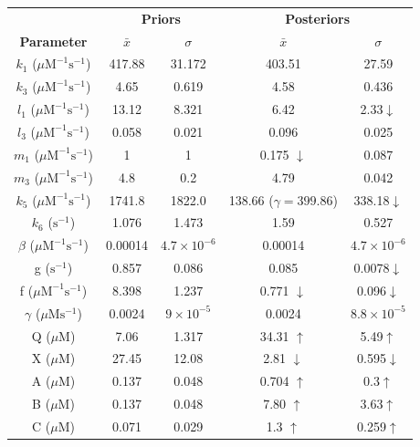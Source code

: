 \begin{table}[tbp]%
\renewcommand{\arraystretch}{1.5}
\begin{center}
\begin{tabular}{ccccc}
\toprule
& \multicolumn{2}{c}{\textbf{Priors}} & \multicolumn{2}{c}{\textbf{Posteriors}} \\
\textbf{Parameter} & ${\bar{x}}$ & $\sigma$ & ${\bar{x}}$ & $\sigma$\\
\midrule
$k_1$ ($\mu \mathrm{M}^{-1} \mathrm{s}^{-1}$) & 417.88 & 31.172 & 403.51 & 27.59\\
$k_3$ ($\mu \mathrm{M}^{-1} \mathrm{s}^{-1}$) & 4.65 &  0.619 & 4.58 & 0.436\\
$l_1$ ($\mu \mathrm{M}^{-1} \mathrm{s}^{-1}$) & 13.12 & 8.321 & 6.42 & 2.33$\downarrow$\\
$l_3$ ($\mu \mathrm{M}^{-1} \mathrm{s}^{-1}$) & 0.058 & 0.021 & 0.096 & 0.025\\
$m_1$ ($\mu \mathrm{M}^{-1} \mathrm{s}^{-1}$) & 1 & 1 & 0.175 $\downarrow$ & 0.087\\
$m_3$ ($\mu \mathrm{M}^{-1} \mathrm{s}^{-1}$) & 4.8 & 0.2 & 4.79 & 0.042\\
$k_5$ ($\mu \mathrm{M}^{-1} \mathrm{s}^{-1}$) & 1741.8 & 1822.0 & 138.66 ($\gamma = 399.86$) & 338.18$\downarrow$\\
$k_6$ ($\mathrm{s}^{-1}$) & 1.076 & 1.473 & 1.59 & 0.527\\
$\beta$ ($\mu \mathrm{M}^{-1} \mathrm{s}^{-1}$) & 0.00014 & $4.7\times 10^{-6}$ & 0.00014 & $4.7\times 10^{-6}$\\
g ($\mathrm{s}^{-1}$) & 0.857 & 0.086 & 0.085 & 0.0078$\downarrow$\\
f ($\mu \mathrm{M}^{-1} \mathrm{s}^{-1}$) & 8.398 & 1.237 & 0.771 $\downarrow$ & 0.096$\downarrow$\\
$\gamma$ ($\mu \mathrm{M} \mathrm{s}^{-1}$) & 0.0024 & $9\times 10^{-5}$ & 0.0024 & $8.8\times 10^{-5}$\\
Q ($\mu \mathrm{M}$) & 7.06 & 1.317 & 34.31 $\uparrow$ & 5.49$\uparrow$\\
X ($\mu \mathrm{M}$) & 27.45 & 12.08 & 2.81 $\downarrow$ & 0.595$\downarrow$\\
A ($\mu \mathrm{M}$) & 0.137 & 0.048 & 0.704 $\uparrow$ & 0.3$\uparrow$\\
B ($\mu \mathrm{M}$) & 0.137 & 0.048 & 7.80 $\uparrow$ & 3.63$\uparrow$\\
C ($\mu \mathrm{M}$) & 0.071 & 0.029 & 1.3 $\uparrow$ & 0.259$\uparrow$\\

\end{tabular}
\end{center}
\end{table}
